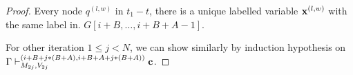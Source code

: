 \documentclass[a4paper,11pt]{article}
\begin{document}
\begin{proof}
 Every node $q^{(l,w)}$ in $t_1-t$, there is a unique labelled variable $\mathbf{{x}}^{(l,w)}$ with the same label in. $G[i+B,\ldots,i+B+A-1]$. 
 
 For other iteration $ 1 \leq j < N$, we can show similarly by induction hypothesis
 on ${\Gamma \vdash^{(i+B+j*(B+A),i+B+A+j*(B+A) )}_{M_{2j}, V_{2j}} \mathbf{{c}} 
}$. 
\end{proof}

\end{document}
